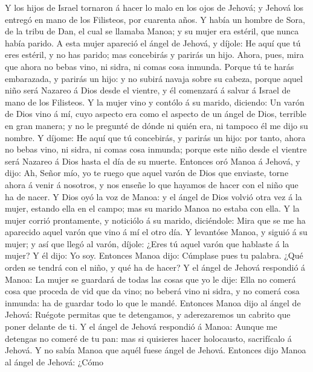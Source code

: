  Y los hijos de Israel tornaron á hacer lo malo en los
ojos de Jehová; y Jehová los entregó en mano de los Filisteos, por
cuarenta años.  Y había un hombre de Sora, de la tribu de
Dan, el cual se llamaba Manoa; y su mujer era estéril, que nunca había
parido.  A esta mujer apareció el ángel de Jehová, y
díjole: He aquí que tú eres estéril, y no has parido; mas concebirás y
parirás un hijo.  Ahora, pues, mira que ahora no bebas
vino, ni sidra, ni comas cosa inmunda.  Porque tú te harás
embarazada, y parirás un hijo: y no subirá navaja sobre su cabeza,
porque aquel niño será Nazareo á Dios desde el vientre, y él comenzará á
salvar á Israel de mano de los Filisteos.  Y la mujer vino
y contólo á su marido, diciendo: Un varón de Dios vino á mí, cuyo
aspecto era como el aspecto de un ángel de Dios, terrible en gran
manera; y no le pregunté de dónde ni quién era, ni tampoco él me dijo su
nombre.  Y díjome: He aquí que tú concebirás, y parirás un
hijo: por tanto, ahora no bebas vino, ni sidra, ni comas cosa inmunda;
porque este niño desde el vientre será Nazareo á Dios hasta el día de su
muerte.  Entonces oró Manoa á Jehová, y dijo: Ah, Señor
mío, yo te ruego que aquel varón de Dios que enviaste, torne ahora á
venir á nosotros, y nos enseñe lo que hayamos de hacer con el niño que
ha de nacer.  Y Dios oyó la voz de Manoa: y el ángel de
Dios volvió otra vez á la mujer, estando ella en el campo; mas su marido
Manoa no estaba con ella.  Y la mujer corrió prontamente,
y noticiólo á su marido, diciéndole: Mira que se me ha aparecido aquel
varón que vino á mí el otro día.  Y levantóse Manoa, y
siguió á su mujer; y así que llegó al varón, díjole: ¿Eres tú aquel
varón que hablaste á la mujer? Y él dijo: Yo soy. 
Entonces Manoa dijo: Cúmplase pues tu palabra. ¿Qué orden se tendrá con
el niño, y qué ha de hacer?  Y el ángel de Jehová
respondió á Manoa: La mujer se guardará de todas las cosas que yo le
dije:  Ella no comerá cosa que proceda de vid que da
vino; no beberá vino ni sidra, y no comerá cosa inmunda: ha de guardar
todo lo que le mandé.  Entonces Manoa dijo al ángel de
Jehová: Ruégote permitas que te detengamos, y aderezaremos un cabrito
que poner delante de ti.  Y el ángel de Jehová respondió
á Manoa: Aunque me detengas no comeré de tu pan: mas si quisieres hacer
holocausto, sacrifícalo á Jehová. Y no sabía Manoa que aquél fuese ángel
de Jehová.  Entonces dijo Manoa al ángel de Jehová: ¿Cómo
